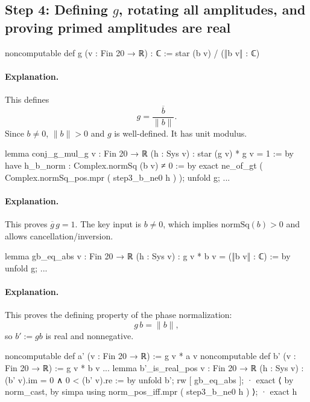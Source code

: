 \documentclass[11pt]{article}
\begin{document}
\subsection*{Step 4: Defining $g$, rotating all amplitudes, and proving primed amplitudes are real}

\begin{LeanCode}
noncomputable def g (v : Fin 20 → ℝ) : ℂ := star (b v) / (‖b v‖ : ℂ)
\end{LeanCode}

\paragraph{Explanation.}
This defines
\[
g=\frac{\overline{b}}{\lVert b\rVert}.
\]
Since $b\neq 0$, $\lVert b\rVert>0$ and $g$ is well-defined.  It has unit modulus.

\begin{LeanCode}
lemma conj_g_mul_g {v : Fin 20 → ℝ} (h : Sys v) : star (g v) * g v = 1 := by
  have h_b_norm : Complex.normSq (b v) ≠ 0 := by
    exact ne_of_gt ( Complex.normSq_pos.mpr ( step3_b_ne0 h ) );
  unfold g; ...
\end{LeanCode}

\paragraph{Explanation.}
This proves $\overline{g}\,g=1$.
The key input is $b\neq 0$, which implies $\mathrm{normSq}(b)>0$ and allows cancellation/inversion.

\begin{LeanCode}
lemma gb_eq_abs {v : Fin 20 → ℝ} (h : Sys v) : g v * b v = (‖b v‖ : ℂ) := by
  unfold g; ...
\end{LeanCode}

\paragraph{Explanation.}
This proves the defining property of the phase normalization:
\[
g\,b=\lVert b\rVert,
\]
so $b' := g b$ is real and nonnegative.

\begin{LeanCode}
noncomputable def a' (v : Fin 20 → ℝ) := g v * a v
noncomputable def b' (v : Fin 20 → ℝ) := g v * b v
...
lemma b'_is_real_pos {v : Fin 20 → ℝ} (h : Sys v) : (b' v).im = 0 ∧ 0 < (b' v).re := by
  unfold b';
  rw [ gb_eq_abs ];
  · exact ⟨ by norm_cast, by simpa using norm_pos_iff.mpr ( step3_b_ne0 h ) ⟩;
  · exact h
\end{LeanCode}
\end{document}

